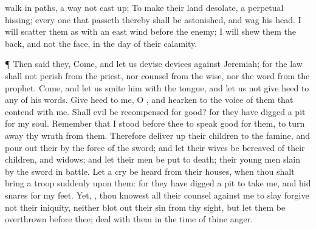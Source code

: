 {walk in
paths,
{} a
way not cast
up;
To
make their
land
desolate,
{} a
perpetual
hissing; every one that
passeth thereby shall be
astonished, and
wag his
head.
I will
scatter them as with an
east
wind
before the
enemy; I will
shew them the
back, and not the
face, in the
day of their
calamity.
\par }{\PP {}¶ Then
said they,
Come, and let us
devise
devices against
Jeremiah; for the
law shall not
perish from the
priest, nor
counsel from the
wise, nor the
word from the
prophet.
Come, and let us
smite him with the
tongue, and let us not give
heed to any of his
words.
Give
heed to me, O
{}, and
hearken to the
voice of them that
contend with me.
Shall
evil be
recompensed for
good? for they have
digged a
pit for my
soul.
Remember that I
stood
before thee to
speak
good for them,
{} to turn
away thy
wrath from them.
Therefore deliver
up their
children to the
famine, and pour
out their
{} by the
force of the
sword; and let their
wives be
bereaved of their children, and
{}
widows; and let their
men be
put to
death;
{} their young
men
{}
slain by the
sword in
battle.
Let a
cry be
heard from their
houses, when thou shalt
bring a
troop
suddenly upon them: for they have
digged a
pit to
take me, and
hid
snares for my
feet.
Yet,
{}, thou
knowest all their
counsel against me to
slay
{}
forgive not their
iniquity, neither blot
out their
sin from thy
sight, but let them be
overthrown
before thee;
deal
{} with them in the
time of thine
anger.

}
